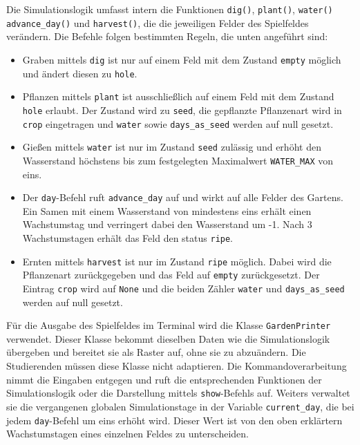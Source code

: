 Die Simulationslogik umfasst intern die Funktionen \texttt{dig()}, \texttt{plant()}, \texttt{water()}\\\texttt{advance\_day()} und \texttt{harvest()}, die die jeweiligen Felder des Spielfeldes verändern. Die Befehle folgen bestimmten Regeln, die unten angeführt sind: 
\begin{itemize}
    \item Graben mittels \texttt{dig} ist nur auf einem Feld mit dem Zustand \texttt{empty} möglich und ändert diesen zu \texttt{hole}.
    \item Pflanzen mittels \texttt{plant} ist ausschließlich auf einem Feld mit dem Zustand \texttt{hole} erlaubt. Der Zustand wird zu \texttt{seed}, die gepflanzte Pflanzenart wird in \texttt{crop} eingetragen und \texttt{water} sowie \texttt{days\_as\_seed} werden auf null gesetzt.
    \item Gießen mittels \texttt{water} ist nur im Zustand \texttt{seed} zulässig und erhöht den Wasserstand höchstens bis zum festgelegten Maximalwert \texttt{WATER\_MAX} von eins.
    \item Der \texttt{day}-Befehl ruft \texttt{advance\_day} auf und wirkt auf alle Felder des Gartens. Ein Samen mit einem Wasserstand von mindestens eins erhält einen Wachstumstag und verringert dabei den Wasserstand um -1. Nach 3 Wachstumstagen erhält das Feld den status \texttt{ripe}.
    \item Ernten mittels \texttt{harvest} ist nur im Zustand \texttt{ripe} möglich. Dabei wird die Pflanzenart zurückgegeben und das Feld auf \texttt{empty} zurückgesetzt. Der Eintrag \texttt{crop} wird auf \texttt{None} und die beiden Zähler \texttt{water} und \texttt{days\_as\_seed} werden auf null gesetzt.
\end{itemize}

Für die Ausgabe des Spielfeldes im Terminal wird die Klasse \texttt{GardenPrinter} verwendet. Dieser Klasse bekommt dieselben Daten wie die Simulationslogik übergeben und bereitet sie als Raster auf, ohne sie zu abzuändern. Die Studierenden müssen diese Klasse nicht adaptieren. Die Kommandoverarbeitung nimmt die Eingaben entgegen und ruft die entsprechenden Funktionen der Simulationslogik oder die Darstellung mittels \texttt{show}-Befehls auf. Weiters verwaltet sie die vergangenen globalen Simulationstage in der Variable \texttt{current\_day}, die bei jedem \texttt{day}-Befehl um eins erhöht wird. Dieser Wert ist von den oben erklärtern Wachstumstagen eines einzelnen Feldes zu unterscheiden.

